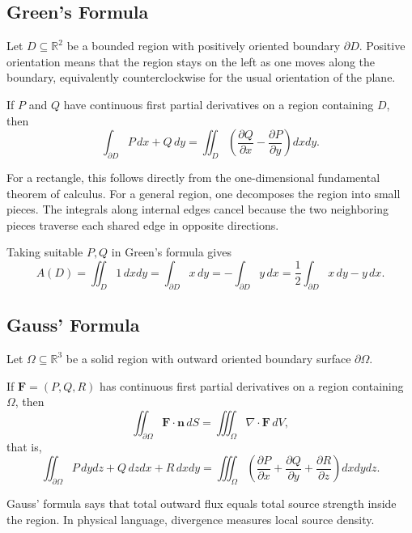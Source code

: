 \subsection{Green's Formula}

Let $D\subseteq\mathbb{R}^2$ be a bounded region with positively oriented boundary $\partial D$. Positive orientation means that the region stays on the left as one moves along the boundary, equivalently counterclockwise for the usual orientation of the plane.

\begin{theorem}
If $P$ and $Q$ have continuous first partial derivatives on a region containing $D$, then
\[
    \int_{\partial D} P\,dx+Q\,dy
    =\iint_D\left(\frac{\partial Q}{\partial x}-\frac{\partial P}{\partial y}\right)dxdy.
\]
\end{theorem}

For a rectangle, this follows directly from the one-dimensional fundamental theorem of calculus. For a general region, one decomposes the region into small pieces. The integrals along internal edges cancel because the two neighboring pieces traverse each shared edge in opposite directions.

\begin{corollary}
Taking suitable $P,Q$ in Green's formula gives
\[
    A(D)=\iint_D1\,dxdy
    =\int_{\partial D}x\,dy
    =-\int_{\partial D}y\,dx
    =\frac12\int_{\partial D}x\,dy-y\,dx.
\]
\end{corollary}

\subsection{Gauss' Formula}

Let $\Omega\subseteq\mathbb{R}^3$ be a solid region with outward oriented boundary surface $\partial\Omega$.

\begin{theorem}
If $\mathbf F=(P,Q,R)$ has continuous first partial derivatives on a region containing $\Omega$, then
\[
    \iint_{\partial\Omega}\mathbf F\cdot\mathbf n\,dS
    =\iiint_{\Omega}\nabla\cdot\mathbf F\,dV,
\]
that is,
\[
    \iint_{\partial\Omega}P\,dydz+Q\,dzdx+R\,dxdy
    =\iiint_{\Omega}
    \left(\frac{\partial P}{\partial x}+\frac{\partial Q}{\partial y}+\frac{\partial R}{\partial z}\right)dxdydz.
\]
\end{theorem}

Gauss' formula says that total outward flux equals total source strength inside the region. In physical language, divergence measures local source density.

